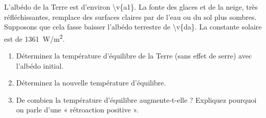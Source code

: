 L'albédo de la Terre est d'environ \num{\v{a1}}. La fonte des glaces et de la neige, très réfléchissantes, remplace des surfaces claires par de l'eau ou du sol plus sombres. Supposons que cela fasse baisser l'albédo terrestre de \num{\v{da}}. La constante solaire est de \qty{1361}{W/m^2}.

\begin{enumerate}[label=\alph*)]
    \item Déterminez la température d'équilibre de la Terre (sans effet de serre) avec l'albédo initial.
    \item Déterminez la nouvelle température d'équilibre.
    \item De combien la température d'équilibre augmente-t-elle ? Expliquez pourquoi on parle d'une « rétroaction positive ».
\end{enumerate}
